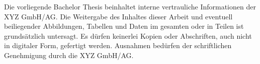 Die vorliegende Bachelor Thesis beinhaltet interne vertrauliche Informationen der XYZ GmbH/AG. Die Weitergabe des Inhaltes dieser Arbeit und eventuell beiliegender Abbildungen, Tabellen und Daten im gesamten oder in Teilen ist grundsätzlich untersagt. Es dürfen keinerlei Kopien oder Abschriften, auch nicht in digitaler Form, gefertigt werden. Ausnahmen bedürfen der schriftlichen Genehmigung durch die XYZ GmbH/AG.
\newpage